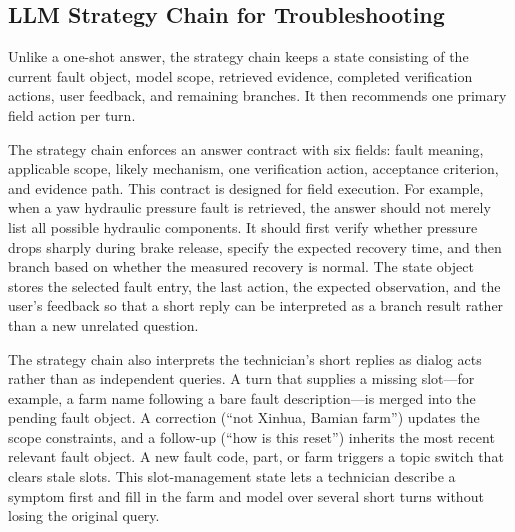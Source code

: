 \documentclass[lettersize,journal]{IEEEtran}
\begin{document}
\subsection{LLM Strategy Chain for Troubleshooting}
Unlike a one-shot answer, the strategy chain keeps a state consisting of the current fault object, model scope, retrieved evidence, completed verification actions, user feedback, and remaining branches. It then recommends one primary field action per turn.

The strategy chain enforces an answer contract with six fields: fault meaning, applicable scope, likely mechanism, one verification action, acceptance criterion, and evidence path. This contract is designed for field execution. For example, when a yaw hydraulic pressure fault is retrieved, the answer should not merely list all possible hydraulic components. It should first verify whether pressure drops sharply during brake release, specify the expected recovery time, and then branch based on whether the measured recovery is normal. The state object stores the selected fault entry, the last action, the expected observation, and the user's feedback so that a short reply can be interpreted as a branch result rather than a new unrelated question.

The strategy chain also interprets the technician's short replies as dialog acts rather than as independent queries. A turn that supplies a missing slot---for example, a farm name following a bare fault description---is merged into the pending fault object. A correction (``not Xinhua, Bamian farm'') updates the scope constraints, and a follow-up (``how is this reset'') inherits the most recent relevant fault object. A new fault code, part, or farm triggers a topic switch that clears stale slots. This slot-management state lets a technician describe a symptom first and fill in the farm and model over several short turns without losing the original query.
\end{document}
